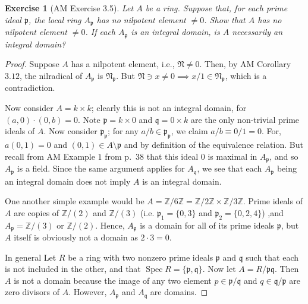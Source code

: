 \documentclass[12pt,letterpaper]{article}
\newtheorem{problem}{Exercise}[section]
\theoremstyle{definition}
\theoremstyle{remark}
\numberwithin{figure}{problem}
\numberwithin{equation}{section}
\DeclareMathOperator{\Spec}{Spec}
\begin{document}
\begin{problem}[AM Exercise 3.5]
  Let $A$ be a ring. Suppose that, for each prime ideal $\mathfrak{p}$, the local ring $A_\mathfrak{p}$ has no nilpotent element $\ne 0$. Show that $A$ has no nilpotent element $\ne 0$. If each $A_\mathfrak{p}$ is an integral domain, is $A$ necessarily an integral domain?
\end{problem}
\begin{proof}
  Suppose $A$ has a nilpotent element, i.e., $\mathfrak{N} \ne 0$. Then, by AM Corollary $3.12$, the nilradical of $A_\mathfrak{p}$ is $\mathfrak{N}_\mathfrak{p}$. But $\mathfrak{N} \ni x \ne 0 \implies x/1 \in \mathfrak{N}_\mathfrak{p}$, which is a contradiction.
  \par Now consider $A = k \times k$; clearly this is not an integral domain, for $(a,0)\cdot(0,b) = 0$. Note $\mathfrak{p} = k \times 0$ and $\mathfrak{q} = 0 \times k$ are the only non-trivial prime ideals of $A$. Now consider $\mathfrak{p}_\mathfrak{p}$; for any $a/b \in \mathfrak{p}_\mathfrak{p}$, we claim $a/b \equiv 0/1 = 0$. For, $a(0,1) = 0$ and $(0,1) \in A \setminus \mathfrak{p}$ and by definition of the equivalence relation. But recall from AM Example $1$ from p.~$38$ that this ideal $0$ is maximal in $A_\mathfrak{p}$, and so $A_\mathfrak{p}$ is a field. Since the same argument applies for $A_\mathfrak{q}$, we see that each $A_\mathfrak{p}$ being an integral domain does not imply $A$ is an integral domain.
  \par One another simple example would be $A = \mathbb{Z}/6\mathbb{Z} = \mathbb{Z}/2\mathbb{Z} \times \mathbb{Z}/3\mathbb{Z}$. Prime ideals of $A$ are copies of $\mathbb{Z}/(2)$ and $ \mathbb{Z}/(3)$ (i.e. $\mathfrak{p}_1 = \{0,3\}$ and $ \mathfrak{p}_2 = \{0,2,4\}$) ,and $A_{\mathfrak{p}} = \mathbb{Z}/(3)$ or $\mathbb{Z}/(2)$. Hence, $A_\mathfrak{p}$ is a domain for all of its prime ideals $\mathfrak{p}$, but $A$ itself is obviously not a domain as $2 \cdot 3 = 0$. 
  \par In general Let $R$ be a ring with two nonzero prime ideals $\mathfrak{p}$ and $\mathfrak{q}$ such that each is not included in the other, and that $\Spec R = \{\mathfrak{p}, \mathfrak{q}\}.$ Now let $A = R/\mathfrak{p}\mathfrak{q}$. Then $A$ is not a domain because the image of any two element $p \in \mathfrak{p}/\mathfrak{q}$ and $q \in \mathfrak{q}/\mathfrak{p}$ are zero divisors of $A$. However, $A_{\mathfrak{p}}$ and  $A_{\mathfrak{q}}$ are domains. 
\end{proof}
\end{document}
